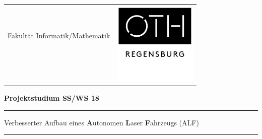 

\titlepage

\begin{center}

\begin{tabular}{cc}
& \multirow{5}{*}{
\includegraphics[height=4.0cm]{images/cover_sheet/OTH_Regensburg_neues_Logo_01}}\tabularnewline

{\large{}Fakultät Informatik/Mathematik}\hspace{1.5cm} & \tabularnewline
 & \tabularnewline
 & \tabularnewline
 & \tabularnewline
\end{tabular}
\par\end{center}

\noindent 
\vspace{0.7cm}


\noindent \begin{center}
\textbf{\huge{}Projektstudium SS/WS 18}
\par\end{center}{\Large \par}
\vspace{1.3cm}

\noindent
\rule{\textwidth}{0.3pt}
\vspace{0.1cm}

\begin{doublespace}
\noindent \begin{center}
{\Large{Verbesserter Aufbau eines \textbf{A}utonomen \textbf{L}aser \textbf{F}ahrzeugs (ALF)}}
\par\end{center}{\large \par}
\end{doublespace}
\noindent\rule{\textwidth}{0.3pt}




\vspace{2.6cm}


